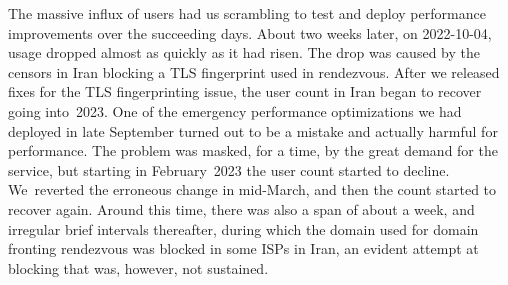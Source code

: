 \documentclass[letterpaper,twocolumn]{article}
\begin{document}
The massive influx of users had us scrambling to test and deploy
performance improvements over the succeeding days.
About two weeks later, on \mbox{2022-10-04},
usage dropped almost as quickly as it had risen.
The drop was caused by
the censors in Iran blocking a TLS fingerprint
used in rendezvous.
After we released fixes for the TLS fingerprinting issue,
the user count in Iran began to recover going into~2023.
One of the emergency performance optimizations we had deployed in late September
turned out to be a mistake and actually harmful for performance.
The problem was masked, for a time, by the great demand for the service,
but starting in February~2023 the user count started to decline.
We~reverted the erroneous change in mid-March,
and then the count started to recover again.
Around this time, there was also a span of about a week,
and irregular brief intervals thereafter, during which
the domain used for domain fronting rendezvous
was blocked in some ISPs in Iran,
an evident attempt at blocking that was, however, not sustained.
\end{document}
